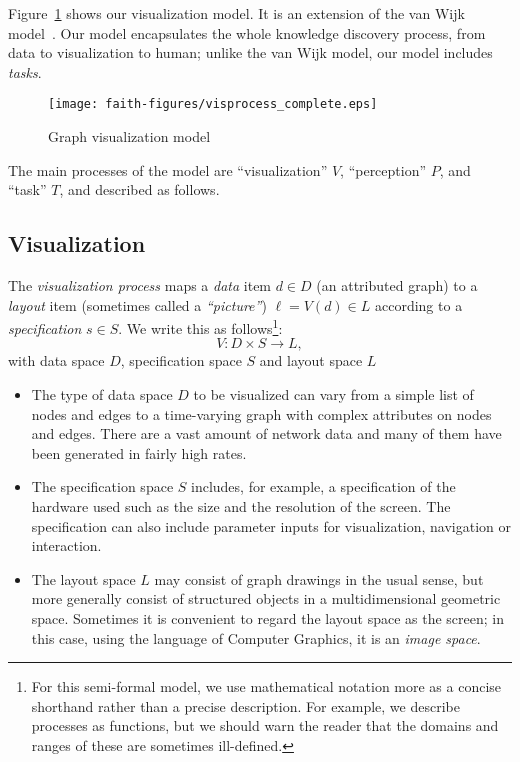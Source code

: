\documentclass[10pt,journal,cspaper,compsoc]{IEEEtran}
\begin{document}
Figure~\ref{fig:vispipeline} shows our visualization model.
It is an extension of the van Wijk model~\cite{van2005value}.
Our model encapsulates the whole knowledge discovery process, from
data to visualization to human; unlike the van Wijk model, our model includes \emph{tasks}.

\begin{figure}\centering
\texttt{[image: faith-figures/visprocess\_complete.eps]}
\caption{Graph visualization model\label{fig:vispipeline}
}
\end{figure}

The main processes of the model are ``visualization'' $V$, ``perception'' $P$, and ``task'' $T$, and described as follows.

\subsection{Visualization}
The \emph{visualization process} maps 
a \emph{data} item $d \in D$ (an attributed graph) to a \emph{layout} item
(sometimes called a \emph{``picture''}) $\ell = V(d) \in L$ according to
a \emph{specification} $s \in S$. We write this as follows\footnote{For this
semi-formal model, we use mathematical notation more as a concise
shorthand rather than a precise description.
 For example, we describe processes as functions, but we
should warn the reader that the domains and ranges of these are sometimes
ill-defined.}:
\begin{equation}
\label{eq:visualization0}
V : D \times S \rightarrow L,
\end{equation}
with data space $D$, specification space $S$ and layout space $L$

\begin{itemize}
\item The type of data space $D$ to be visualized can vary from a simple list of nodes and edges
to a time-varying graph with complex attributes on nodes and edges. 
There are a vast amount of network data and many of them have been generated in fairly high rates.
\item 
The specification space $S$ includes, for example,
a specification of the hardware used such as the size and the resolution of the screen. The specification can also include parameter inputs for visualization, navigation or interaction.
\item
The layout space $L$ may consist of graph drawings in the usual sense, but more generally consist of structured objects
in a multidimensional geometric space. Sometimes it is convenient to regard the layout space as the screen; in this case, using the language of Computer Graphics, it is an \emph{image space}.
\end{itemize}
\end{document}
